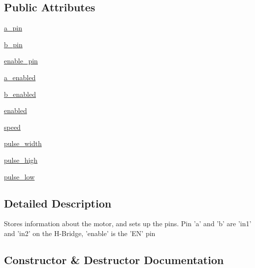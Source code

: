 \subsection*{Public Attributes}
\begin{DoxyCompactItemize}
\item 
\mbox{\hyperlink{class_motor_1_1_motor_a9bb6737a01af43393af8adced5a478a3}{a\+\_\+pin}}
\item 
\mbox{\hyperlink{class_motor_1_1_motor_a8b625c6152a1428fd80ce08ca42440d6}{b\+\_\+pin}}
\item 
\mbox{\hyperlink{class_motor_1_1_motor_a2e4704349ae6d0a47f2d9d8e86290ffe}{enable\+\_\+pin}}
\item 
\mbox{\hyperlink{class_motor_1_1_motor_a38cf3355fa1ced6aea642b65d8f1bd5c}{a\+\_\+enabled}}
\item 
\mbox{\hyperlink{class_motor_1_1_motor_aa2e2e43d109c4711df0087a90bf3de14}{b\+\_\+enabled}}
\item 
\mbox{\hyperlink{class_motor_1_1_motor_a005d2c31df0e94b8c9002e36b8af7fba}{enabled}}
\item 
\mbox{\hyperlink{class_motor_1_1_motor_a73455a68e45e155c7709d1b4ec2005d6}{speed}}
\item 
\mbox{\hyperlink{class_motor_1_1_motor_a68d4a60b126c7b5d435dfda08d8e0c26}{pulse\+\_\+width}}
\item 
\mbox{\hyperlink{class_motor_1_1_motor_a30553a87fea4c45c7dc9a0d908d55d7c}{pulse\+\_\+high}}
\item 
\mbox{\hyperlink{class_motor_1_1_motor_a75e04d07608f99293ddafc69f5364783}{pulse\+\_\+low}}
\end{DoxyCompactItemize}


\subsection{Detailed Description}
\begin{DoxyVerb}Stores information about the motor, and sets up the pins.
Pin 'a' and 'b' are 'in1' and 'in2' on the H-Bridge, 'enable' is the 'EN' pin
\end{DoxyVerb}
 

\subsection{Constructor \& Destructor Documentation}
\mbox{\label{class_motor_1_1_motor_aaa1c1666508649052047c99cbf697e3e}} 
